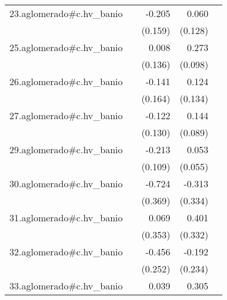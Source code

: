 {\begin{longtable}{l*{4}{D{.}{.}{-1}}}
\addlinespace
23.aglomerado#c.hv\_banio&                     &      -0.205         &       0.060         &                     \\
            &                     &     (0.159)         &     (0.128)         &                     \\
\addlinespace
25.aglomerado#c.hv\_banio&                     &       0.008         &       0.273\sym{**} &                     \\
            &                     &     (0.136)         &     (0.098)         &                     \\
\addlinespace
26.aglomerado#c.hv\_banio&                     &      -0.141         &       0.124         &                     \\
            &                     &     (0.164)         &     (0.134)         &                     \\
\addlinespace
27.aglomerado#c.hv\_banio&                     &      -0.122         &       0.144         &                     \\
            &                     &     (0.130)         &     (0.089)         &                     \\
\addlinespace
29.aglomerado#c.hv\_banio&                     &      -0.213         &       0.053         &                     \\
            &                     &     (0.109)         &     (0.055)         &                     \\
\addlinespace
30.aglomerado#c.hv\_banio&                     &      -0.724         &      -0.313         &                     \\
            &                     &     (0.369)         &     (0.334)         &                     \\
\addlinespace
31.aglomerado#c.hv\_banio&                     &       0.069         &       0.401         &                     \\
            &                     &     (0.353)         &     (0.332)         &                     \\
\addlinespace
32.aglomerado#c.hv\_banio&                     &      -0.456         &      -0.192         &                     \\
            &                     &     (0.252)         &     (0.234)         &                     \\
\addlinespace
33.aglomerado#c.hv\_banio&                     &       0.039         &       0.305\sym{***}&                     \\

\end{longtable}}
